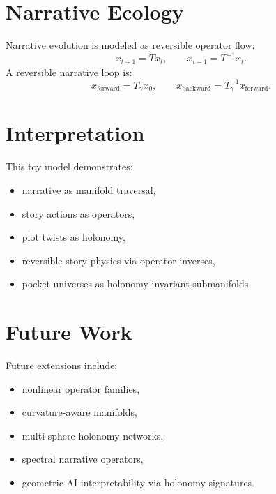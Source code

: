 \documentclass[11pt]{article}
\begin{document}
\section{Narrative Ecology}

Narrative evolution is modeled as reversible operator flow:
\[
x_{t+1} = T x_t,
\qquad
x_{t-1} = T^{-1} x_t.
\]
A reversible narrative loop is:
\[
x_{\text{forward}} = T_{\gamma} x_0,
\qquad
x_{\text{backward}} = T_{\gamma}^{-1} x_{\text{forward}}.
\]

\section{Interpretation}

This toy model demonstrates:
\begin{itemize}
    \item narrative as manifold traversal,
    \item story actions as operators,
    \item plot twists as holonomy,
    \item reversible story physics via operator inverses,
    \item pocket universes as holonomy-invariant submanifolds.
\end{itemize}

\section{Future Work}

Future extensions include:
\begin{itemize}
    \item nonlinear operator families,
    \item curvature-aware manifolds,
    \item multi-sphere holonomy networks,
    \item spectral narrative operators,
    \item geometric AI interpretability via holonomy signatures.
\end{itemize}



\end{document}
